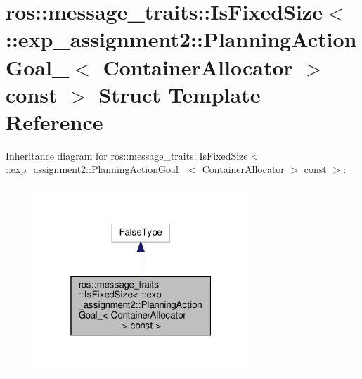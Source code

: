 \hypertarget{structros_1_1message__traits_1_1IsFixedSize_3_01_1_1exp__assignment2_1_1PlanningActionGoal___3_07ea983ea7a4ff50e3d80fe3536e8ea26}{}\section{ros\+:\+:message\+\_\+traits\+:\+:Is\+Fixed\+Size$<$ \+:\+:exp\+\_\+assignment2\+:\+:Planning\+Action\+Goal\+\_\+$<$ Container\+Allocator $>$ const $>$ Struct Template Reference}
\label{structros_1_1message__traits_1_1IsFixedSize_3_01_1_1exp__assignment2_1_1PlanningActionGoal___3_07ea983ea7a4ff50e3d80fe3536e8ea26}


Inheritance diagram for ros\+:\+:message\+\_\+traits\+:\+:Is\+Fixed\+Size$<$ \+:\+:exp\+\_\+assignment2\+:\+:Planning\+Action\+Goal\+\_\+$<$ Container\+Allocator $>$ const $>$\+:
\nopagebreak
\begin{figure}[H]
\begin{center}
\leavevmode
\includegraphics[width=229pt]{structros_1_1message__traits_1_1IsFixedSize_3_01_1_1exp__assignment2_1_1PlanningActionGoal___3_0613b33d78696b3c27905a733379fdfb0}
\end{center}
\end{figure}


